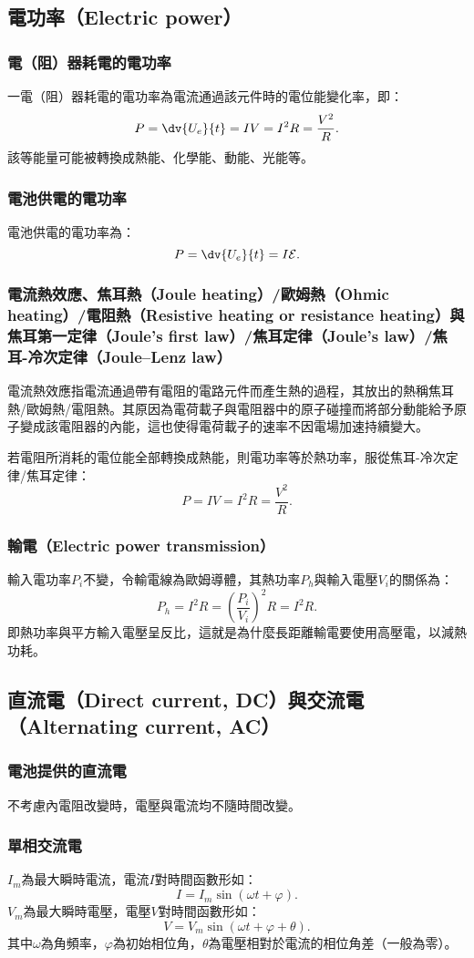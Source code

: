 \documentclass[a4paper,12pt]{report}
\begin{document}
\begin{itemize}
\subsection{電功率（Electric power）}
\subsubsection{電（阻）器耗電的電功率}
一電（阻）器耗電的電功率為電流通過該元件時的電位能變化率，即：
\[P=\dv{U_e}{t}=IV=I^2R=\frac{V^2}{R}.\]
該等能量可能被轉換成熱能、化學能、動能、光能等。
\subsubsection{電池供電的電功率}
電池供電的電功率為：
\[P=\dv{U_e}{t}=I\mathcal{E}.\]
\subsubsection{電流熱效應、焦耳熱（Joule heating）/歐姆熱（Ohmic heating）/電阻熱（Resistive heating or resistance heating）與焦耳第一定律（Joule's first law）/焦耳定律（Joule's law）/焦耳-冷次定律（Joule–Lenz law）}
電流熱效應指電流通過帶有電阻的電路元件而產生熱的過程，其放出的熱稱焦耳熱/歐姆熱/電阻熱。其原因為電荷載子與電阻器中的原子碰撞而將部分動能給予原子變成該電阻器的內能，這也使得電荷載子的速率不因電場加速持續變大。

若電阻所消耗的電位能全部轉換成熱能，則電功率等於熱功率，服從焦耳-冷次定律/焦耳定律：
\[P=IV=I^2R=\frac{V^2}{R}.\]
\subsubsection{輸電（Electric power transmission）}
輸入電功率$P_i$不變，令輸電線為歐姆導體，其熱功率$P_h$與輸入電壓$V_i$的關係為：
\[P_h=I^2R=\left(\frac{P_i}{V_i}\right)^2R=I^2R.\]
即熱功率與平方輸入電壓呈反比，這就是為什麼長距離輸電要使用高壓電，以減熱功耗。
\subsection{直流電（Direct current, DC）與交流電（Alternating current, AC）}
\subsubsection{電池提供的直流電}
不考慮內電阻改變時，電壓與電流均不隨時間改變。
\subsubsection{單相交流電}
$I_m$為最大瞬時電流，電流$I$對時間函數形如：
\[I=I_m\sin(\omega t+\varphi).\]
$V_m$為最大瞬時電壓，電壓$V$對時間函數形如：
\[V=V_m\sin(\omega t+\varphi+\theta).\]
其中$\omega$為角頻率，$\varphi$為初始相位角，$\theta$為電壓相對於電流的相位角差（一般為零）。


\end{itemize}
\end{document}
